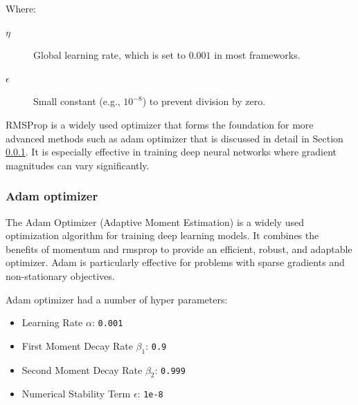 				
		Where:
		\begin{description}
			\item[$\eta$] Global learning rate, which is set to $0.001$ in most frameworks.
			\item[$\epsilon$] Small constant (e.g., $10^{-8}$) to prevent division by zero.
		\end{description}
		\bigskip

		
		RMSProp is a widely used optimizer that forms the foundation for more advanced methods such as adam optimizer that is discussed in detail in Section \ref{section:adam}. It is especially effective in training deep neural networks where gradient magnitudes can vary significantly.

	
		\bigskip
		\subsubsection{Adam optimizer}
		\label{section:adam}
		
		The Adam Optimizer (Adaptive Moment Estimation)\cite{joshi2019performance} is a widely used optimization algorithm for training deep learning models. It combines the benefits of momentum and rmsprop to provide an efficient, robust, and adaptable optimizer. Adam is particularly effective for problems with sparse gradients and non-stationary objectives.
		
		
		Adam optimizer had a number of hyper parameters:
		
		\begin{itemize}
			\item Learning Rate $\alpha$: \texttt{0.001}
			\item First Moment Decay Rate $\beta_1$: \texttt{0.9}
			\item Second Moment Decay Rate $\beta_2$: \texttt{0.999}
			\item Numerical Stability Term $\epsilon$: \texttt{1e-8}
		\end{itemize}
		\bigskip

